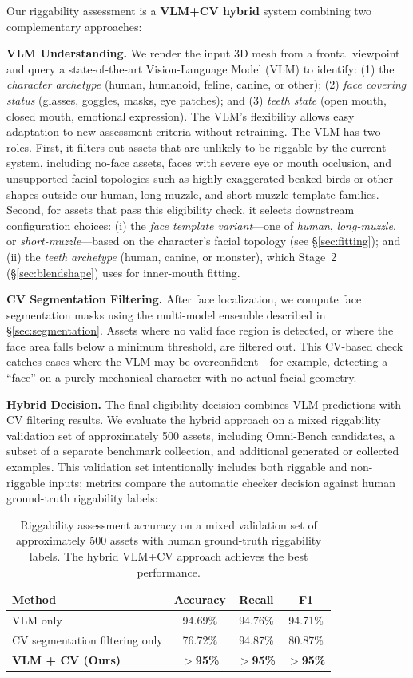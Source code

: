 \documentclass[acmtog,anonymous,review]{acmart}
\begin{document}
Our riggability assessment is a \textbf{VLM+CV hybrid} system combining two complementary approaches:

\textbf{VLM Understanding.} We render the input 3D mesh from a frontal viewpoint and query a state-of-the-art Vision-Language Model (VLM) to identify: (1) the \emph{character archetype} (human, humanoid, feline, canine, or other); (2) \emph{face covering status} (glasses, goggles, masks, eye patches); and (3) \emph{teeth state} (open mouth, closed mouth, emotional expression). The VLM's flexibility allows easy adaptation to new assessment criteria without retraining. The VLM has two roles. First, it filters out assets that are unlikely to be riggable by the current system, including no-face assets, faces with severe eye or mouth occlusion, and unsupported facial topologies such as highly exaggerated beaked birds or other shapes outside our human, long-muzzle, and short-muzzle template families. Second, for assets that pass this eligibility check, it selects downstream configuration choices: (i) the \emph{face template variant}---one of \emph{human}, \emph{long-muzzle}, or \emph{short-muzzle}---based on the character's facial topology (see \S\ref{sec:fitting}); and (ii) the \emph{teeth archetype} (human, canine, or monster), which Stage~2 (\S\ref{sec:blendshape}) uses for inner-mouth fitting.

\textbf{CV Segmentation Filtering.} After face localization, we compute face segmentation masks using the multi-model ensemble described in \S\ref{sec:segmentation}. Assets where no valid face region is detected, or where the face area falls below a minimum threshold, are filtered out. This CV-based check catches cases where the VLM may be overconfident---for example, detecting a ``face'' on a purely mechanical character with no actual facial geometry.

\textbf{Hybrid Decision.} The final eligibility decision combines VLM predictions with CV filtering results. We evaluate the hybrid approach on a mixed riggability validation set of approximately 500 assets, including Omni-Bench candidates, a subset of a separate benchmark collection, and additional generated or collected examples. This validation set intentionally includes both riggable and non-riggable inputs; metrics compare the automatic checker decision against human ground-truth riggability labels:

\begin{table}[t]
  \caption{Riggability assessment accuracy on a mixed validation set of approximately 500 assets with human ground-truth riggability labels. The hybrid VLM+CV approach achieves the best performance.}
  \label{tab:riggability}
  \begin{tabular}{lccc}
    \toprule
    Method & Accuracy & Recall & F1 \\
    \midrule
    VLM only & 94.69\% & 94.76\% & 94.71\% \\
    CV segmentation filtering only & 76.72\% & 94.87\% & 80.87\% \\
    \textbf{VLM + CV (Ours)} & \textbf{$>$95\%} & \textbf{$>$95\%} & \textbf{$>$95\%} \\
    \bottomrule
  \end{tabular}
\end{table}
\end{document}
